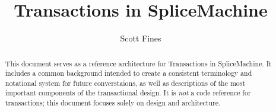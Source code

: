 \documentclass[10pt]{amsart}
\begin{document}
\title{Transactions in SpliceMachine}
\author{Scott Fines}

\begin{abstract}
This document serves as a reference architecture for Transactions in SpliceMachine. It includes a common background intended to create a consistent terminology and notational system for future converstaions, as well as descriptions of the most important components of the transactional design. It is \emph{not} a code reference for transactions; this document focuses solely on design and architecture.
\end{abstract}

\maketitle


\end{document}
